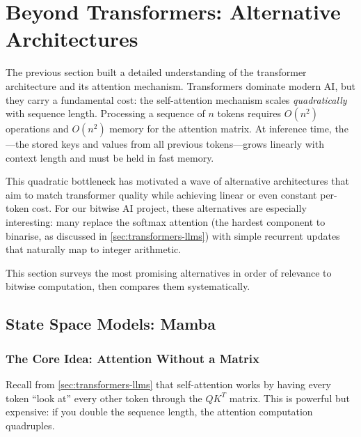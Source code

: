 \section{Beyond Transformers: Alternative Architectures}
\label{sec:alt-architectures}

The previous section built a detailed understanding of the transformer
architecture and its attention mechanism. Transformers dominate modern
AI, but they carry a fundamental cost: the self-attention mechanism
scales \emph{quadratically} with sequence length. Processing a
sequence of $n$ tokens requires $O(n^2)$ operations and $O(n^2)$
memory for the attention matrix. At inference time, the
---the stored keys and values from all previous
tokens---grows linearly with context length and must be held in fast
memory.

This quadratic bottleneck has motivated a wave of alternative
architectures that aim to match transformer quality while achieving
linear or even constant per-token cost. For our bitwise AI project,
these alternatives are especially interesting: many replace the
softmax attention (the hardest component to binarise, as discussed in
\cref{sec:transformers-llms}) with simple recurrent updates that
naturally map to integer arithmetic.

This section surveys the most promising alternatives in order of
relevance to bitwise computation, then compares them systematically.

\subsection{State Space Models: Mamba}
\label{sec:mamba}

\subsubsection{The Core Idea: Attention Without a Matrix}

Recall from \cref{sec:transformers-llms} that self-attention works by
having every token ``look at'' every other token through the $QK^T$
matrix. This is powerful but expensive: if you double the sequence
length, the attention computation quadruples.

